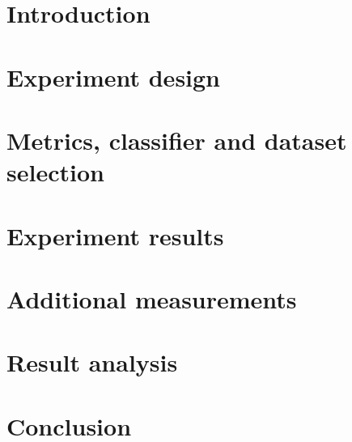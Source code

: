 \documentclass[a4paper,11pt,pdftex,halfparskip,cleardoubleempty]{scrbook}
\begin{document}

\pagestyle{plain} 



\section{Introduction}
\label{sec:introduction}


\section{Experiment design}
\label{sec:experiment}


\section{Metrics, classifier and dataset selection}
\label{sec:selection}


\section{Experiment results}
\label{sec:results}


\section{Additional measurements}
\label{sec:additional}


\section{Result analysis}
\label{sec:testing}



\section{Conclusion}
\label{sec:conclusion}




\end{document}
